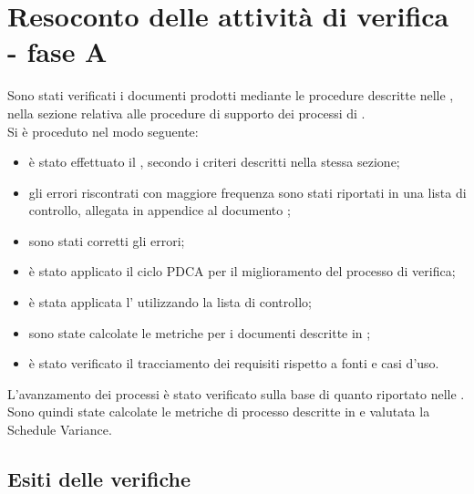 \section{Resoconto delle attività di verifica - fase A}
Sono stati verificati i documenti prodotti mediante le procedure descritte nelle \NormeDiProgetto{}, nella sezione relativa alle procedure di supporto dei processi di \VV{}.\\
Si è proceduto nel modo seguente:\begin{itemize}
	\item è stato effettuato il , secondo i criteri descritti nella stessa sezione;
	\item gli errori riscontrati con maggiore frequenza sono stati riportati in una lista di controllo, allegata in appendice al documento \NormeDiProgetto{};
	\item sono stati corretti gli errori;
	\item è stato applicato il ciclo PDCA per il miglioramento del processo di verifica;
	\item è stata applicata l' utilizzando la lista di controllo;
	\item sono state calcolate le metriche per i documenti descritte in ;
	\item è stato verificato il tracciamento dei requisiti rispetto a fonti e casi d'uso.
\end{itemize}
L'avanzamento dei processi è stato verificato sulla base di quanto riportato nelle \NormeDiProgetto{}. Sono quindi state calcolate le metriche di processo descritte in  e valutata la Schedule Variance.

\subsection{Esiti delle verifiche}
